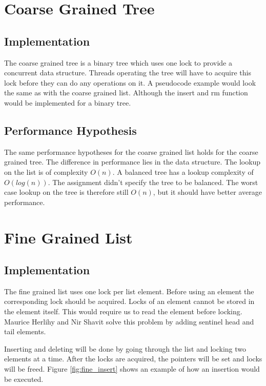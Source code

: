 \documentclass[10pt,a4paper]{article}
\begin{document}
\section{Coarse Grained Tree} \subsection{Implementation} The coarse grained
tree is a binary tree which uses one lock to provide a concurrent data
structure. Threads operating the tree will have to acquire this lock before
they can do any operations on it. A pseudocode example would look the same as
with the coarse grained list. Although the insert and rm function would be
implemented for a binary tree.

\subsection{Performance Hypothesis} The same performance hypotheses for the
coarse grained list holds for the coarse grained tree. The difference in
performance lies in the data structure. The lookup on the list is of complexity
$O(n)$. A balanced tree has a lookup complexity of $O(log(n))$. The assignment
didn't specify the tree to be balanced. The worst case lookup on the tree is
therefore still $O(n)$, but it should have better average performance.

\section{Fine Grained List} \subsection{Implementation} The fine grained list
uses one lock per list element. Before using an element the corresponding lock
should be acquired. Locks of an element cannot be stored in the element
itself. This would require us to read the element before locking. Maurice
Herlihy and Nir Shavit solve this problem by adding sentinel head and tail
elements.
 
Inserting and deleting will be done by going through the list and locking two
elements at a time. After the locks are acquired, the pointers will be set and
locks will be freed. Figure \ref{fig:fine_insert} shows an example of how an insertion
would be executed.
\end{document}

